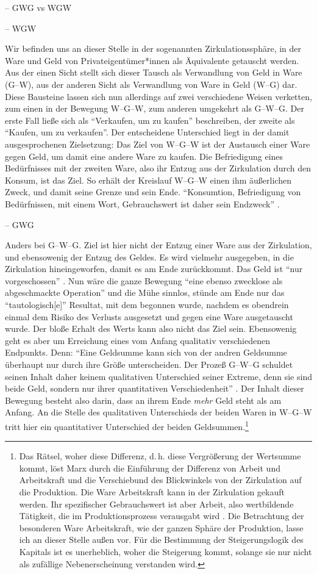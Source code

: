 \documentclass[12pt,
               DIV13,
               paper=a4,
               twoside=false,
               onehalfspacing,
               bibliography=totoc,
               toc=graduated,
               draft,
               ]{scrartcl}
\newcommand{\pc}[2]{\parencite[#1]{#2}}
\newcommand{\vgl}[2]{\parencite[vgl.][#1]{#2}}
\newcommand{\wgw}{W--G--W\xspace}
\begin{document}
-- GWG vs WGW

-- WGW

Wir befinden uns an dieser Stelle in der sogenannten
Zirkulationssphäre, in der Ware und Geld von Privateigentümer*innen
als Äquivalente getauscht werden. Aus der einen Sicht stellt sich
dieser Tausch als Verwandlung von Geld in Ware (G--W), aus der anderen
Sicht als Verwandlung von Ware in Geld (W--G) dar. Diese Bausteine
lassen sich nun allerdings auf zwei verschiedene Weisen verketten, zum
einen in der Bewegung \wgw, zum anderen umgekehrt als G--W--G. Der
erste Fall ließe sich als "`Verkaufen, um zu kaufen"' beschreiben, der
zweite als "`Kaufen, um zu verkaufen"'. Der entscheidene Unterschied
liegt in der damit ausgesprochenen Zielsetzung: Das Ziel von \wgw ist
der Austausch einer Ware gegen Geld, um damit eine andere Ware zu
kaufen.
Die Befriedigung eines Bedürfnisses mit der zweiten Ware, also ihr
Entzug aus der Zirkulation durch den Konsum, ist das Ziel. So erhält
der Kreislauf \wgw einen ihm äußerlichen Zweck, und damit seine Grenze
und sein Ende. "`Konsumtion, Befriedigung von Bedürfnissen, mit einem
Wort, Gebrauchswert ist daher sein Endzweck"' \pc{164}{kap}.

-- GWG

Anders bei G--W--G. Ziel ist hier nicht der Entzug einer Ware aus der
Zirkulation, und ebensowenig der Entzug des Geldes. Es wird vielmehr
ausgegeben, in die Zirkulation hineingeworfen, damit es am Ende
zurückkommt. Das Geld ist "`nur vorgeschossen"' \pc{163}{kap}. Nun
wäre die ganze Bewegung "`eine ebenso zwecklose als abgeschmackte
Operation"' \pc{165}{kap} und die Mühe sinnlos, stünde am Ende nur das
"`tautologisch[e]"' \pc{164}{kap} Resultat, mit dem begonnen wurde,
nachdem es obendrein einmal dem Risiko des Verlusts ausgesetzt und
gegen eine Ware ausgetauscht wurde. Der bloße Erhalt des Werts kann
also nicht das Ziel sein. Ebensowenig geht es aber um Erreichung eines
vom Anfang qualitativ verschiedenen Endpunkts. Denn: "`Eine Geldsumme
kann sich von der andren Geldsumme überhaupt nur durch ihre Größe
unterscheiden. Der Prozeß G--W--G schuldet seinen Inhalt daher keinem
qualitativen Unterschied seiner Extreme, denn sie sind beide Geld,
sondern nur ihrer quantitativen Verschiedenheit"' \pc{165}{kap}. Der
Inhalt dieser Bewegung besteht also darin, dass an ihrem Ende
\emph{mehr} Geld steht als am Anfang. An die Stelle des qualitativen
Unterschieds der beiden Waren in \wgw tritt hier ein quantitativer
Unterschied der beiden Geldsummen.\footnote{Das Rätsel, woher diese
Differenz, d.\,h. diese Vergrößerung der Wertsumme kommt, löst Marx
durch die Einführung der Differenz von Arbeit und Arbeitskraft und die
Verschiebund des Blickwinkels von der Zirkulation auf die Produktion.
Die Ware Arbeitskraft kann in der Zirkulation gekauft werden. Ihr
spezifischer Gebrauchswert ist aber Arbeit, also wertbildende
Tätigkeit, die im Produktionsprozess verausgabt wird \vgl{xx}{kap}.
Die Betrachtung der besonderen Ware Arbeitskraft, wie der ganzen
Sphäre der Produktion, lasse ich an dieser Stelle außen vor. Für die
Bestimmung der Steigerungslogik des Kapitals ist es unerheblich, woher
die Steigerung kommt, solange sie nur nicht als zufällige
Nebenerscheinung verstanden wird.}
\end{document}
